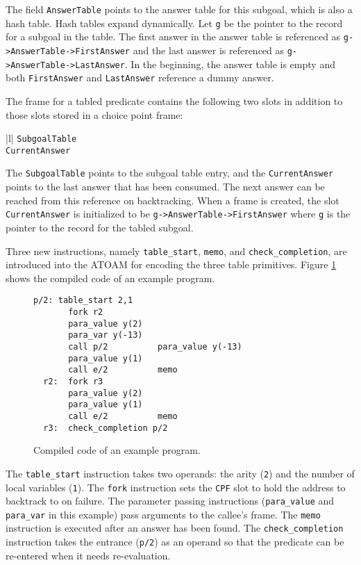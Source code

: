 \documentclass{tlp}
\begin{document}
The field {\tt AnswerTable} points to the answer table for this subgoal, which is also a hash table. Hash tables expand dynamically. Let {\tt g} be the pointer to the record for a subgoal in the table. The first answer in the answer table is referenced as \verb+g->AnswerTable->FirstAnswer+ and the last answer is referenced as \verb+g->AnswerTable->LastAnswer+. In the beginning, the answer table is empty and both {\tt FirstAnswer} and {\tt LastAnswer} reference a dummy answer.

The frame for a tabled predicate contains the following two slots in addition to those slots stored in a choice point frame:   
\begin{center}
\begin{oldtabular}{|l|}  \oldhline
{\tt SubgoalTable} \\ \oldhline
{\tt CurrentAnswer} \\ \oldhline
\end{oldtabular}
\end{center}

\noindent
The {\tt SubgoalTable} points to the subgoal table entry, and the {\tt CurrentAnswer} points to the last answer that has been consumed. The next answer can be reached from this reference on backtracking. When a frame is created, the slot {\tt CurrentAnswer} is initialized to be \verb+g->AnswerTable->FirstAnswer+ where {\tt g} is the pointer to the record for the tabled subgoal.

Three new instructions, namely {\tt table\_start}, {\tt memo}, and {\tt check\_completion}, are introduced into the ATOAM for encoding the three table primitives. Figure \ref{fig:ins} shows the compiled code of an example program.
\begin{figure}
\begin{verbatim}
p/2: table_start 2,1
       fork r2
       para_value y(2)
       para_var y(-13)
       call p/2          para_value y(-13)
       para_value y(1)
       call e/2          memo
  r2:  fork r3
       para_value y(2)
       para_value y(1)
       call e/2          memo
  r3:  check_completion p/2
\end{verbatim}
\caption{\label{fig:ins}Compiled code of an example program.}
\end{figure}

The {\tt table\_start} instruction takes two operands: the arity ({\tt 2}) and the number of local variables ({\tt 1}). The {\tt fork} instruction sets the {\tt CPF} slot to hold the address to backtrack to on failure. The parameter passing instructions ({\tt para\_value} and {\tt para\_var} in this example) pass arguments to the callee's frame. The {\tt memo} instruction is executed after an answer has been found. The {\tt check\_completion} instruction takes the entrance ({\tt p/2}) as an operand so that the predicate can be re-entered when it needs re-evaluation.
\end{document}
